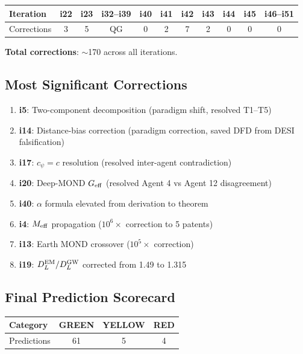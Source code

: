 \documentclass[11pt,a4paper]{article}
\begin{document}
\begin{center}
\begin{tabular}{lcccccccccc}
\toprule
Iteration & i22 & i23 & i32--i39 & i40 & i41 & i42 & i43 & i44 & i45 & i46--i51 \\
\midrule
Corrections & 3 & 5 & QG & 0 & 2 & 7 & 2 & 0 & 0 & 0 \\
\bottomrule
\end{tabular}
\end{center}

\textbf{Total corrections}: $\sim$170 across all iterations.

\subsection{Most Significant Corrections}

\begin{enumerate}
\item \textbf{i5}: Two-component decomposition (paradigm shift, resolved T1--T5)
\item \textbf{i14}: Distance-bias correction (paradigm correction, saved DFD from DESI falsification)
\item \textbf{i17}: $c_\psi = c$ resolution (resolved inter-agent contradiction)
\item \textbf{i20}: Deep-MOND $G_{\rm eff}$ (resolved Agent 4 vs Agent 12 disagreement)
\item \textbf{i40}: $\alpha$ formula elevated from derivation to theorem
\item \textbf{i4}: $M_{\rm eff}$ propagation ($10^6\times$ correction to 5 patents)
\item \textbf{i13}: Earth MOND crossover ($10^5\times$ correction)
\item \textbf{i19}: $D_L^{\rm EM}/D_L^{\rm GW}$ corrected from 1.49 to 1.315
\end{enumerate}

\subsection{Final Prediction Scorecard}

\begin{center}
\begin{tabular}{lccc}
\toprule
\textbf{Category} & \textbf{GREEN} & \textbf{YELLOW} & \textbf{RED} \\
\midrule
Predictions & 61 & 5 & 4 \\
\bottomrule
\end{tabular}
\end{center}
\end{document}

